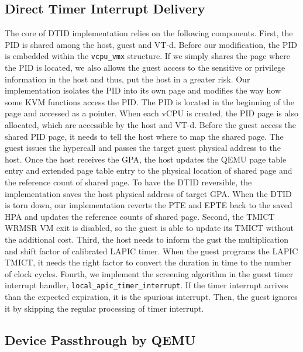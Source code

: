 \subsection{Direct Timer Interrupt Delivery}
The core of DTID implementation relies on the following
components. First, the PID is shared among the host, guest and
VT-d. Before our modification, the PID is embedded within the
\texttt{vcpu\_vmx} structure. If we simply shares the page
where the PID is located, we also allows the guest access to
the sensitive or privilege information in the host and thus,
put the host in a greater risk. Our implementation isolates
the PID into its own page and modifies the way how some KVM
functions access the PID. The PID is located in the beginning
of the page and accessed as a pointer. When each vCPU is
created, the PID page is also allocated, which are accessible
by the host and VT-d. Before the guest access the shared PID
page, it needs to tell the host where to map the shared page.
The guest issues the hypercall and passes the target guest
physical address to the host. Once the host receives the GPA,
the host updates the QEMU page table entry and extended page
table entry to the physical location of shared page and the
reference count of shared page. To have the DTID reversible,
the implementation saves the host physical address of target
GPA. When the DTID is torn down, our implementation reverts
the PTE and EPTE back to the saved HPA and updates the
reference counts of shared page. Second, the TMICT WRMSR VM
exit is disabled, so the guest is able to update its TMICT
without the additional cost. Third, the host needs to inform
the gust the multiplication and shift factor of calibrated
LAPIC timer. When the guest programs the LAPIC TMICT, it needs
the right factor to convert the duration in time to the number
of clock cycles. Fourth, we implement the screening algorithm
in the guest timer interrupt handler,
\texttt{local\_apic\_timer\_interrupt}. If the timer interrupt
arrives than the expected expiration, it is the spurious
interrupt. Then, the guest ignores it by skipping the regular
processing of timer interrupt.

\subsection{Device Passthrough by QEMU}


